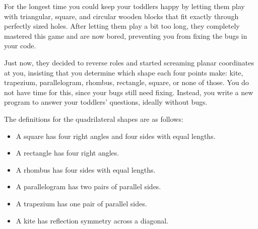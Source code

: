 




For the longest time you could keep your toddlers happy by letting them play with
triangular, square, and circular wooden blocks that fit exactly through perfectly sized holes.
After letting them play a bit too long, they completely mastered this game and are
now bored, preventing you from fixing the bugs in your code.

Just now, they decided to reverse roles and started screaming planar coordinates at you,
insisting that you determine which shape each four points make:
kite, trapezium, parallelogram, rhombus, rectangle, square, or none of those.
You do not have time for this, since your bugs still need fixing.
Instead, you write a new program to answer your toddlers' questions, ideally without bugs.

The definitions for the quadrilateral shapes are as follows:
\vspace{-0.75em}
\begin{itemize}
    \setlength\itemsep{0pt}
    \item A square has four right angles and four sides with equal lengths.
    \item A rectangle has four right angles.
    \item A rhombus has four sides with equal lengths.
    \item A parallelogram has two pairs of parallel sides.
    \item A trapezium has one pair of parallel sides.
    \item A kite has reflection symmetry across a diagonal.
\end{itemize}

